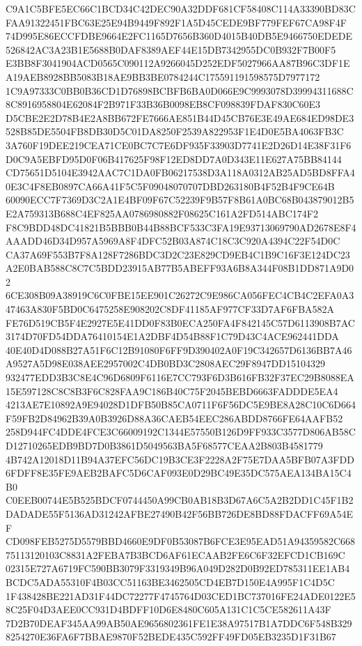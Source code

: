 \documentclass[UTF8,fontset=fandol,zihao=-4,a4paper]{ctexart}
\begin{document}
{{C9A1C5BFE5EC66C1BCD34C42DEC90A32DDF681CF58408C114A33390BD83CFAA91322451FBC63E25E94B9449F892F1A5D45CEDE9BF779FEF67CA98F4F
74D995E86ECCFDBE9664E2FC1165D7656B360D4015B40DB5E9466750EDEDE526842AC3A23B1E5688B0DAF8389AEF44E15DB7342955DC0B932F7B00F5
E3BB8F3041904ACD0565C090112A9266045D252EDF5027966AA87B96C3DF1EA19AEB8928BB5083B18AE9BB3BE0784244C175591191598575D7977172
1C9A97333C0BB0B36CD1D76898BCBFB6BA0D066E9C9993078D39994311688C8C8916958804E62084F2B971F33B36B0098EB8CF098839FDAF830C60E3
D5CBE2E2D78B4E2A8BB672FE7666AE851B44D45CB76E3E49AE684ED98DE3528B85DE5504FB8DB30D5C01DA8250F2539A822953F1E4D0E5BA4063FB3C
3A760F19DEE219CEA71CE0BC7C7E6DF935F33903D7741E2D26D14E38F31F6D0C9A5EBFD95D0F06B417625F98F12ED8DD7A0D343E11E627A75BB84144
CD75651D5104E3942AAC7C1DA0FB06217538D3A118A0312AB25AD5BD8FFA40E3C4F8EB0897CA66A41F5C5F09048070707DBD263180B4F52B4F9CE64B
60090ECC7F7369D3C2A1E4BF09F67C52239F9B57F8B61A0BC68B043879012B5E2A759313B688C4EF825AA0786980882F08625C161A2FD514ABC174F2
F8C9BDD48DC41821B5BBB0B44B88BCF533C3FA19E93713069790AD2678E8F4AAADD46D34D957A5969A8F4DFC52B03A874C18C3C920A4394C22F54D0C
CA37A69F553B7F8A128F7286BDC3D2C23E829CD9EB4C1B9C16F3E124DC23A2E0BAB588C8C7C5BDD23915AB77B5ABEFF93A6B8A344F08B1DD871A9D02
6CE308B09A38919C6C0FBE15EE901C26272C9E986CA056FEC4CB4C2EFA0A347463A830F5BD0C6475258E908202C8DF41185AF977CF33D7AF6FBA582A
FE76D519CB5F4E2927E5E41DD0F83B0ECA250FA4F842145C57D6113908B7AC3174D70FD54DDA76410154E1A2DBF4D54B88F1C79D43C4ACE962441DDA
40E40D4D088B27A51F6C12B91080F6FF9D390402A0F19C342657D6136BB7A46A9527A5D98E038AEE2957002C4DB0BD3C2808AEC29F8947DD15104329
932477EDD3B3C8E4C96D6809F6116E7CC793F6D3B616FB32F37EC29B8088EA15E597128C8C8B3F6C828FAA9C186B40C75F2045BEBD6663FADDDE5EA4
4213AE7E10892A9E94028D1DFB50B85CA0711F6F56DC5E9BE8A28C10C6D664F59FB2D84962B39A0B3926D88A36CAEB54EEC286ABDD8766FE64AAFB52
258D944FC4DDE4FCE3C66009192C1344E57550B126D9FF933C3577D806AB58CD12710265EDB9BD7D0B3861D5049563BA5F68577CEAA2B803B4581779
4B742A12018D11B94A37EFC56DC19B3CE3F2228A2F75E7DAA5BFB07A3FDD6FDFF8E35FE9AEB2BAFC5D6CAF093E0D29BC49E35DC575AEA134BA15C4B0
C0EEB00744E5B525BDCF0744450A99CB0AB18B3D67A6C5A2B2DD1C45F1B2DADADE55F5136AD31242AFBE27490B42F56BB726DE8BD88FDACFF69A54EF
CD098FEB5275D5579BBD4660E9DF0B53087B6FCE3E95EAD51A94359582C66875113120103C8831A2FEBA7B3BCD6AF61ECAAB2FE6C6F32EFCD1CB169C
02315E727A6719FC590BB3079F3319349B96A049D282D0B92ED785311EE1AB4BCDC5ADA55310F4B03CC51163BE3462505CD4EB7D150E4A995F1C4D5C
1F438428BE221AD31F44DC72277F4745764D03CED1BC737016FE24ADE0122E58C25F04D3AEE0CC931D4BDFF10D6E8480C605A131C1C5CE582611A43F
7D2B70DEAF345AA99AB50AE9656802361FE1E38A97517B1A7DDC6F548B3298254270E36FA6F7BBAE9870F52BEDE435C592FF49FD05EB3235D1F31B67
}}
\end{document}
